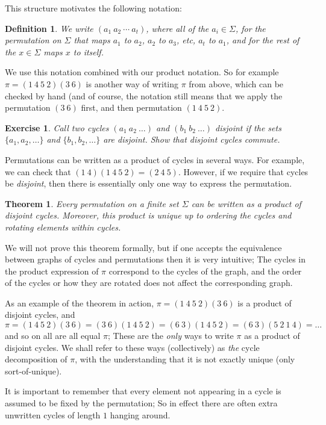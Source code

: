 \documentclass[11pt]{article}
\newtheorem{exercise}{Exercise}
\newtheorem{theorem}{Theorem}
\newtheorem{definition}{Definition}
\begin{document}
This structure motivates the following notation:
\begin{definition}
    We write $(a_1\ a_2\ \cdots\ a_t)$, where all of the $a_i\in\Sigma$,
    for the permutation on $\Sigma$ that maps $a_1$ to $a_2$,
    $a_2$ to $a_3$, etc, $a_t$ to $a_1$, and for the rest
    of the $x\in\Sigma$ maps $x$ to itself.
\end{definition}
We use this notation combined with our product notation. So for example $\pi =
(1\ 4\ 5\ 2)(3\ 6)$ is another way of writing $\pi$ from above, which can be
checked by hand (and of course, the notation still means that we apply the
permutation $(3\ 6)$ first, and then permutation $(1\ 4\ 5\ 2)$. 

\begin{exercise}
    Call two cycles $(a_1\ a_2\ \ldots)$ and $(b_1\ b_2\ \ldots)$
    \emph{disjoint} if the sets $\{a_1,a_2,\ldots\}$ and $\{b_1,b_2,\ldots\}$
    are disjoint.  Show that disjoint cycles commute.
\end{exercise}

Permutations can be written as a product of cycles in several ways. For
example, we can check that $(1\ 4)(1\ 4\ 5\ 2)= (2\ 4\ 5)$. However,
if we require that cycles be \emph{disjoint}, then there is essentially
only one way to express the permutation.
\begin{theorem}
    Every permutation on a finite set $\Sigma$ can be written as a
    product of disjoint cycles. Moreover, this product is unique up
    to ordering the cycles and rotating elements within cycles.
\end{theorem}
We will not prove this theorem formally, but if one accepts the equivalence
between graphs of cycles and permutations then it is very intuitive; The cycles
in the product expression of $\pi$ correspond to the cycles of the graph, and
the order of the cycles or how they are rotated does not affect the
corresponding graph.


As an example  of the theorem in action,
$\pi = (1\ 4\ 5\ 2)(3\ 6)$ is a product of disjoint cycles, and
\[
    \pi 
    = (1\ 4\ 5\ 2)(3\ 6)
    = (3\ 6)(1\ 4\ 5\ 2)
    = (6\ 3)(1\ 4\ 5\ 2)
    = (6\ 3)(5\ 2\ 1\ 4) = \ldots
\]
and so on all are all equal $\pi$; These are the \emph{only} ways to write
$\pi$ as a product of disjoint cycles. We shall refer to these ways
(collectively) as \emph{the} cycle decomposition of $\pi$, with the
understanding that it is not exactly unique (only sort-of-unique).

It is important to remember that every element not appearing in a cycle is
assumed to be fixed by the permutation; So in effect there are often extra
unwritten cycles of length $1$ hanging around.
\end{document}
